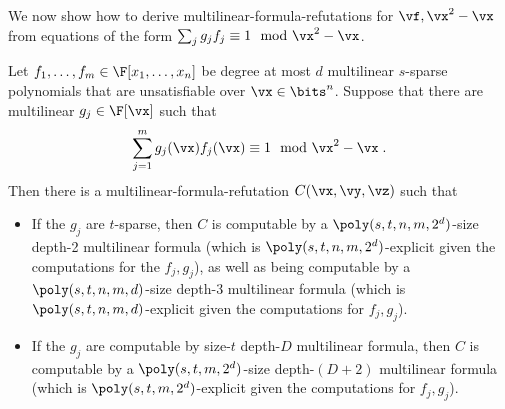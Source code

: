 \documentclass{toc}
\begin{document}
We now show how to derive multilinear-formula-\lbIPS refutations for $\vf,\vx^2-\vx$ from equations of the form $\sum_j g_jf_j\equiv 1\mod\vx^2-\vx$.

\begin{corollary}\label{res:multilin:multilin-lbIPS}
        Let $f_1,\ldots,f_m\in\F[x_1,\ldots,x_n]$ be degree at most $d$ multilinear $s$-sparse polynomials that are unsatisfiable over $\vx\in\bits^n$.  Suppose that there are multilinear $g_j\in\F[\vx]$ such that
        \[
                \sum_{j=1}^m g_j(\vx)f_j(\vx)\equiv 1\mod\vx^2-\vx
                \;.
        \]
        Then there is a multilinear-formula-\lbIPS refutation $C(\vx,\vy,\vz)$ such that
        \begin{itemize}
                \item If the $g_j$ are $t$-sparse, then $C$ is computable by a $\poly(s,t,n,m,2^d)$-size depth-2 multilinear formula (which is $\poly(s,t,n,m,2^d)$-explicit given the computations for the $f_j,g_j$), as well as being computable by a $\poly(s,t,n,m,d)$-size depth-3 multilinear formula (which is $\poly(s,t,n,m,d)$-explicit given the computations for $f_j,g_j$).
                \item If the $g_j$ are computable by size-$t$ depth-$D$ multilinear formula, then $C$ is computable by a $\poly(s,t,m,2^d)$-size depth-$(D+2)$ multilinear formula (which is $\poly(s,t,m,2^d)$-explicit given the computations for $f_j,g_j$).
        \end{itemize}
\end{corollary}
\end{document}
